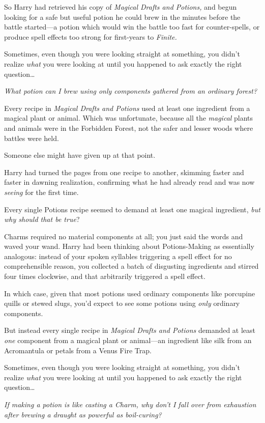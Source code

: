 So Harry had retrieved his copy of \emph{Magical Drafts and Potions,} and begun looking for a safe but useful potion he could brew in the minutes before the battle started—a potion which would win the battle too fast for counter-spells, or produce spell effects too strong for first-years to \emph{Finite.}

Sometimes, even though you were looking straight at something, you didn’t realize \emph{what} you were looking at until you happened to ask exactly the right question…

\emph{What potion can I brew using only components gathered from an ordinary forest?}

Every recipe in \emph{Magical Drafts and Potions} used at least one ingredient from a magical plant or animal. Which was unfortunate, because all the \emph{magical} plants and animals were in the Forbidden Forest, not the safer and lesser woods where battles were held.

Someone else might have given up at that point.

Harry had turned the pages from one recipe to another, skimming faster and faster in dawning realization, confirming what he had already read and was now \emph{seeing} for the first time.

Every single Potions recipe seemed to demand at least one magical ingredient, \emph{but why should that be true}?

Charms required no material components at all; you just said the words and waved your wand. Harry had been thinking about Potions-Making as essentially analogous: instead of your spoken syllables triggering a spell effect for no comprehensible reason, you collected a batch of disgusting ingredients and stirred four times clockwise, and that arbitrarily triggered a spell effect.

In which case, given that most potions used ordinary components like porcupine quills or stewed slugs, you’d expect to see some potions using \emph{only} ordinary components.

But instead every single recipe in \emph{Magical Drafts and Potions} demanded at least \emph{one} component from a magical plant or animal—an ingredient like silk from an Acromantula or petals from a Venus Fire Trap.

Sometimes, even though you were looking straight at something, you didn’t realize \emph{what} you were looking at until you happened to ask exactly the right question…

\emph{If making a potion is like casting a Charm, why don’t I fall over from exhaustion after brewing a draught as powerful as boil-curing?}


